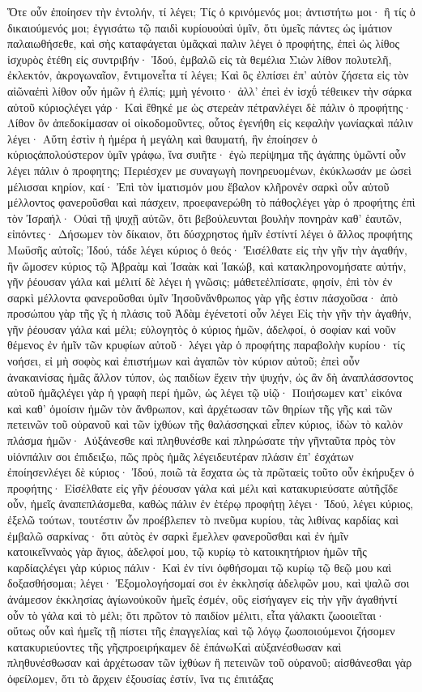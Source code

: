 Ὅτε οὖν ἐποίησεν τὴν ἐντολήν, τί λέγει; Τίς ὁ κρινόμενός μοι; ἀντιστήτω μοι· ἢ τίς ὁ δικαιούμενός μοι; ἐγγισάτω τῷ παιδὶ κυρίουοὐαὶ ὑμῖν, ὅτι ὑμεῖς πάντες ὡς ἱμάτιον παλαιωθήσεθε, καὶ σὴς καταφάγεται ὑμᾶςκαὶ παλιν λέγει ὁ προφήτης, ἐπεὶ ὡς λίθος ἰσχυρὸς ἐτέθη εἰς συντριβήν· Ἰδού, ἐμβαλῶ εἰς τὰ θεμέλια Σιὼν λίθον πολυτελῆ, ἐκλεκτόν, ἀκρογωναῖον, ἔντιμονεἶτα τί λέγει; Καὶ ὃς ἐλπίσει ἐπ’ αὐτὸν ζήσετα εἰς τὸν αἰῶναἐπὶ λίθον οὖν ἡμῶν ἡ ἐλπίς; μͅμὴ γένοιτο· ἀλλ’ ἐπεὶ ἐν ἰσχΰ τέθεικεν τὴν σάρκα αὐτοῦ κύριοςλέγει γάρ· Καὶ ἔθηκέ με ὡς στερεὰν πέτρανλέγει δὲ πάλιν ὁ προφήτης· Λίθον ὃν ἀπεδοκίμασαν οἱ οἰκοδομοῦντες, οὗτος ἐγενήθη εἰς κεφαλὴν γωνίαςκαὶ πάλιν λέγει· Αὔτη ἐστὶν ἡ ἡμέρα ἡ μεγάλη καὶ θαυματή, ἣν ἐποίησεν ὁ κύριοςἀπολούστερον ὑμῖν γράφω, ἵνα συιῆτε· ἐγὼ περίψημα τῆς ἀγάπης ὑμῶντί οὖν λέγει πάλιν ὁ προφητης; Περιέσχεν με συναγωγὴ πονηρευομένων, ἐκύκλωσάν με ὡσεὶ μέλισσαι κηρίον, καί· Ἐπὶ τὸν ἱματισμόν μου ἔβαλον κλῆρονἐν σαρκὶ οὖν αὐτοῦ μέλλοντος φανεροῦσθαι καὶ πάσχειν, προεφανερώθη τὸ πάθοςλέγει γὰρ ὁ προφήτης ἐπὶ τὸν Ἰσραήλ· Οὐαὶ τῇ ψυχῇ αὐτῶν, ὅτι βεβούλευνται βουλὴν πονηρὰν καθ’ ἑαυτῶν, εἰπόντες· Δήσωμεν τὸν δίκαιον, ὅτι δύσχρηστος ἡμῖν ἐστίντί λέγει ὁ ἄλλος προφήτης Μωϋσῆς αὐτοῖς; Ἰδού, τάδε λέγει κύριος ὁ θεός· Ἐισέλθατε εἰς τὴν γῆν τὴν ἀγαθήν, ἣν ὤμοσεν κύριος τῷ Ἀβραὰμ καὶ Ἰσαὰκ καὶ Ἰακώβ, καὶ κατακληρονομήσατε αὐτήν, γῆν ῥέουσαν γάλα καὶ μέλιτί δὲ λέγει ἡ γνῶσις; μάθετεἐλπίσατε, φησίν, ἐπὶ τὸν ἐν σαρκὶ μέλλοντα φανεροῦσθαι ὑμῖν Ἰησοῦνἄνθρωπος γὰρ γῆς ἐστιν πάσχοῦσα· ἀπὸ προσώπου γὰρ τῆς γ͂ς ἡ πλάσις τοῦ Ἀδὰμ ἐγένετοτί οὖν λέγει Εἰς τὴν γῆν τὴν ἀγαθήν, γῆν ῥέουσαν γάλα καὶ μέλι; εὐλογητὸς ὁ κύριος ἡμῶν, ἀδελφοί, ὁ σοφίαν καὶ νοῦν θέμενος ἐν ἡμῖν τῶν κρυφίων αὐτοῦ· λέγει γὰρ ὁ προφήτης παραβολὴν κυρίου· τίς νοήσει, εἰ μὴ σοφὸς καὶ ἐπιστήμων καὶ ἀγαπῶν τὸν κύριον αὐτοῦ; ἐπεὶ οὖν ἀνακαινίσας ἡμᾶς ἄλλον τύπον, ὡς παιδίων ἔχειν τὴν ψυχήν, ὡς ἂν δὴ ἀναπλάσσοντος αὐτοῦ ἡμᾶςλέγει γὰρ ἡ γραφὴ περί ἡμῶν, ὡς λέγει τῷ υἱῷ· Ποιήσωμεν κατ’ εἰκόνα καὶ καθ’ ὁμοίσιν ἡμῶν τὸν ἄνθρωπον, καὶ ἀρχέτωσαν τῶν θηρίων τῆς γῆς καὶ τῶν πετεινῶν τοῦ οὐρανοῦ καὶ τῶν ἰχθύων τῆς θαλάσσηςκαὶ εἶπεν κύριος, ἰδὼν τὸ καλὸν πλάσμα ἡμῶν· Αὐξάνεσθε καὶ πληθυνέσθε καὶ πληρώσατε τὴν γῆνταῦτα πρὸς τὸν υἱόνπάλιν σοι ἐπιδειξω, πῶς πρὸς ἡμᾶς λέγειδευτέραν πλάσιν ἐπ’ ἐσχάτων ἐποίησενλέγει δὲ κύριος· Ἰδού, ποιῶ τὰ ἔσχατα ὡς τὰ πρῶταεἰς τοῦτο οὖν ἐκήρυξεν ὁ προφήτης· Εἰσέλθατε εἰς γῆν ῥέουσαν γάλα καὶ μέλι καὶ κατακυριεύσατε αὐτῆςἴδε οὖν, ἡμεῖς ἀναπεπλάσμεθα, καθὼς πάλιν ἐν ἑτέρῳ προφήτῃ λέγει· Ἰδού, λέγει κύριος, ἐξελῶ τούτων, τουτέστιν ὧν προέβλεπεν τὸ πνεῦμα κυρίου, τὰς λιθίνας καρδίας καὶ ἐμβαλῶ σαρκίνας· ὅτι αὐτὸς ἐν σαρκὶ ἔμελλεν φανεροῦσθαι καὶ ἐν ἡμῖν κατοικεῖνναὸς γὰρ ἅγιος, ἀδελφοί μου, τῷ κυρίῳ τὸ κατοικητήριον ἡμῶν τῆς καρδίαςλέγει γὰρ κύριος πάλιν· Καὶ ἐν τίνι ὀφθήσομαι τῷ κυρίῳ τῷ θεῷ μου καὶ δοξασθήσομαι; λέγει· Ἐξομολογήσομαί σοι ἐν ἐκκλησίᾳ ἀδελφῶν μου, καὶ ψαλῶ σοι ἀνάμεσον ἐκκλησίας ἁγίωνοὐκοῦν ἡμεῖς ἐσμέν, οὓς εἰσήγαγεν εἰς τὴν γῆν ἀγαθήντί οὖν τὸ γάλα καὶ τὸ μέλι; ὅτι πρῶτον τὸ παιδίον μέλιτι, εἶτα γάλακτι ζωοοιεῖται· οὕτως οὖν καὶ ἡμεῖς τῇ πίστει τῆς ἐπαγγελίας καὶ τῷ λόγῳ ζωοποιούμενοι ζήσομεν κατακυριεύοντες τῆς γῆςπροειρήκαμεν δὲ ἐπάνωΚαὶ αὐξανέσθωσαν καὶ πληθυνέσθωσαν καὶ ἀρχέτωσαν τῶν ἰχθύων ἢ πετεινῶν τοῦ οὐρανοῦ; αἰσθάνεσθαι γὰρ ὀφείλομεν, ὅτι τὸ ἄρχειν ἐξουσίας ἐστίν, ἵνα τις ἐπιτάξας 